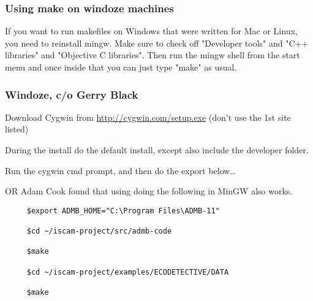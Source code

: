 \begin{frame}
	\frametitle{Using make on windoze machines}
	If you want to run makefiles on Windows that were written for Mac or Linux, you need to reinstall mingw.  Make sure to check off "Developer tools" and "C++ libraries" and "Objective C libraries".  Then run the mingw shell from the start menu and once inside that you can just type "make" as usual.
\end{frame}

\begin{frame}[fragile]
	\frametitle{Windoze, c/o Gerry Black}
	Download Cygwin from \url{http://cygwin.com/setup.exe}  (don't use the 1st site listed)

	During the install do the default install, except also include the developer folder.

	Run the cygwin cmd prompt, and then do the export below…

	OR Adam Cook found that using doing the following in MinGW also works.

	\begin{verbatim}
	 $export ADMB_HOME="C:\Program Files\ADMB-11"
	 
	 $cd ~/iscam-project/src/admb-code
	 
	 $make
	 
	 $cd ~/iscam-project/examples/ECODETECTIVE/DATA
	 
	 $make
	\end{verbatim}	
\end{frame}



